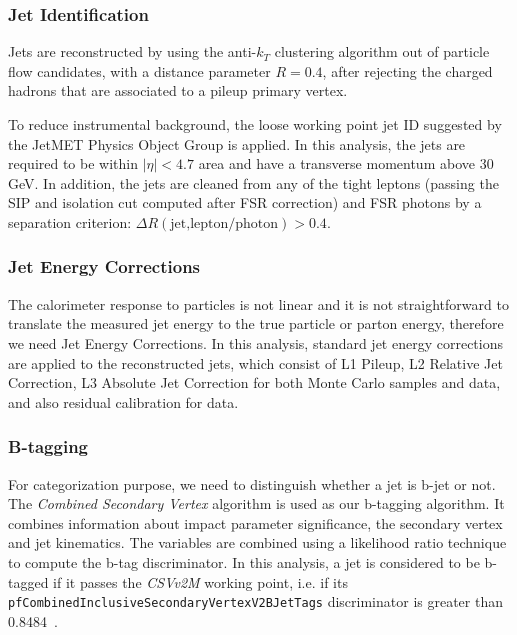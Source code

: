 \subsubsection{Jet Identification}

Jets are reconstructed by using the anti-$k_T$ clustering algorithm out of particle flow candidates, with a distance parameter $R = 0.4$, 
after rejecting the charged hadrons that are associated to a pileup primary  vertex.

To reduce instrumental background, the loose working point jet ID suggested by the JetMET Physics Object Group is applied. 
In this analysis, the jets are required to be within $|\eta| < 4.7$ area and have a transverse momentum above 30 GeV. 
In addition, the jets are cleaned from any of the tight leptons (passing the SIP and isolation cut computed after FSR correction) 
and FSR photons by a separation criterion: $\Delta R(\text{jet,lepton/photon}) > 0.4$.


\subsubsection{Jet Energy Corrections}

The calorimeter response to particles is not linear
and it is not straightforward to translate the measured jet energy
to the true particle or parton energy, therefore we need Jet Energy Corrections.
In this analysis, standard jet energy corrections are applied to the reconstructed jets,
which consist of L1 Pileup, L2 Relative Jet Correction,
L3 Absolute Jet Correction for both Monte Carlo samples and data,
and also residual calibration for data.




\subsubsection{B-tagging}

For categorization purpose, we need to distinguish whether a jet is b-jet or not.
The \emph{Combined Secondary Vertex} algorithm is used as our b-tagging algorithm.
It combines information about impact parameter significance,
the secondary vertex and jet kinematics.
The variables are combined using a likelihood ratio technique to compute the b-tag discriminator.
In this analysis, a jet is considered to be b-tagged if it passes the \emph{CSVv2M} working point,
i.e. if its \verb|pfCombinedInclusiveSecondaryVertexV2BJetTags| discriminator is greater than 0.8484~\cite{btagReferenceEffsRun2}.

